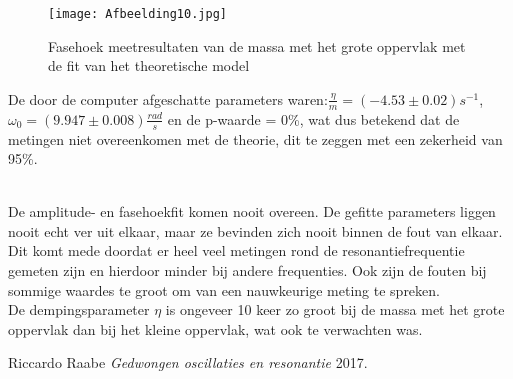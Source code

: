 \documentclass[12pt,a4]{article}
\begin{document}
\begin{itemize}
\begin{figure}[h]
\centering
\texttt{[image: Afbeelding10.jpg]}
\caption{Fasehoek meetresultaten van de massa met het grote oppervlak met de fit van het theoretische model}
\end{figure}

De door de computer afgeschatte parameters waren:$\frac{\eta}{m} = (-4.53 \pm 0.02)s^{-1}$, $\omega_0 = (9.947 \pm 0.008)\frac{rad}{s}$ en de
p-waarde = 0\%, wat dus betekend dat de metingen niet overeenkomen met de theorie, dit te zeggen met een zekerheid van 95\%.\\ \\
\end{itemize}

De amplitude- en fasehoekfit komen nooit overeen. De gefitte parameters liggen nooit echt ver uit elkaar, maar ze bevinden zich nooit binnen de fout van elkaar. Dit komt mede doordat er heel veel metingen rond de resonantiefrequentie gemeten zijn en hierdoor minder bij andere frequenties. Ook zijn de fouten bij sommige waardes te groot om van een nauwkeurige meting te spreken.\\
De dempingsparameter $\eta$ is ongeveer 10 keer zo groot bij de massa met het grote oppervlak dan bij het kleine oppervlak, wat ook te verwachten was.\\

\begin{thebibliography}{1}
 Riccardo Raabe 
{\em Gedwongen oscillaties en resonantie}  2017.
\end{thebibliography}
\end{document}
